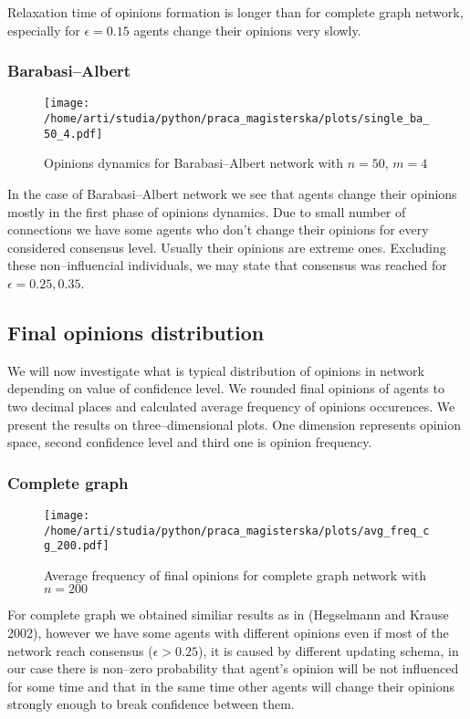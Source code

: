 \documentclass{article}
\begin{document}
Relaxation time of opinions formation is longer than for complete graph network, especially for $\epsilon=0.15$ agents change their opinions very slowly.

\subsubsection{Barabasi--Albert}

\begin{figure}[H]
		\centering
		\texttt{[image: /home/arti/studia/python/praca\_magisterska/plots/single\_ba\_50\_4.pdf]}
		\caption{Opinions dynamics for Barabasi--Albert network with $n=50$, $m=4$}
\end{figure}
In the case of Barabasi--Albert network we see that agents change their opinions mostly in the first phase of opinions dynamics. Due to small number of connections we have some agents who don't change their opinions for every considered consensus level. Usually their opinions are extreme ones. Excluding these non--influencial individuals, we may state that consensus was reached for $\epsilon=0.25, 0.35$.

\subsection{Final opinions distribution}

We will now investigate what is typical distribution of opinions in network depending on value of confidence level. We rounded final opinions of agents to two decimal places and calculated average frequency of opinions occurences. We present the results on three--dimensional plots. One dimension represents opinion space, second confidence level and third one is opinion frequency.

\subsubsection{Complete graph}

\begin{figure}[H]
		\centering
		\texttt{[image: /home/arti/studia/python/praca\_magisterska/plots/avg\_freq\_cg\_200.pdf]}
		\caption{Average frequency of final opinions for complete graph network with $n=200$}
\end{figure}

For complete graph we obtained similiar results as in (Hegselmann and Krause 2002), however we have some agents with different opinions even if most of the network reach consensus ($\epsilon > 0.25$), it is caused by different updating schema, in our case there is non--zero probability that agent's opinion will be not influenced for some time and that in the same time other agents will change their opinions strongly enough to break confidence between them.
\indent
\end{document}
